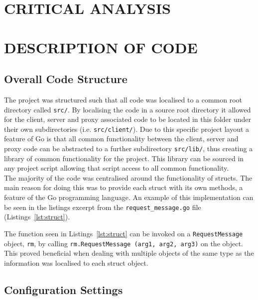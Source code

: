 \documentclass[10pt,twocolumn]{witseiepaper}
\begin{document}
\section{CRITICAL ANALYSIS}


\section{DESCRIPTION OF CODE}

	\subsection{Overall Code Structure}

		The project was structured such that all code was localised to a common root directory called \texttt{src/}. By localising the code in a source root directory it allowed for the client, server and proxy associated code to be located in this folder under their own subdirectories (i.e. \texttt{src/client/}). Due to this specific project layout a feature of Go is that all common functionality between the client, server and proxy code can be abstracted to a further subdirectory \texttt{src/lib/}, thus creating a library of common functionality for the project. This library can be sourced in any project script allowing that script access to all common functionality.\\
		
		The majority of the code was centralised around the functionality of structs. The main reason for doing this was to provide each struct with its own methods, a feature of the Go programming language. An example of this implementation can be seen in the listings excerpt from the \texttt{request\_message.go} file (Listings~\ref{lst:struct}). 
		
		
		
		The function seen in Listings~\ref{lst:struct} can be invoked on a \texttt{RequestMessage} object, \texttt{rm}, by calling \texttt{rm.RequestMessage (arg1, arg2, arg3)} on the object. This proved beneficial when dealing with multiple objects of the same type as the information was localised to each struct object. \\
		
	\subsection{Configuration Settings}
		
\end{document}
